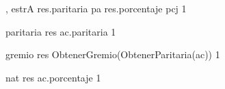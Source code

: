 {, }{estrA}
{
	\state res.paritaria \asig pa								
	\state res.porcentaje \asig pcj								
}
{1}
{}

{}{paritaria}
{
	\state res \asig ac.paritaria 								
}
{1}
{}

{}{gremio}
{
	\state res \asig ObtenerGremio(ObtenerParitaria(ac)) 		
}
{1}
{}

{}{nat}
{
	\state res \asig ac.porcentaje		
}
{1}
{}